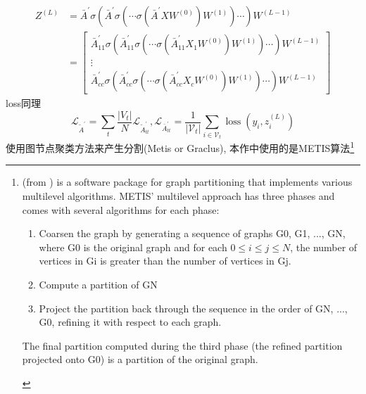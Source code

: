 \documentclass{article}
\begin{document}
    \begin{equation}
        \begin{aligned}
        Z^{(L)} &=\bar{A}^{\prime} \sigma\left(\bar{A}^{\prime} \sigma\left(\cdots \sigma\left(\bar{A}^{\prime} X W^{(0)}\right) W^{(1)}\right) \cdots\right) W^{(L-1)} \\
        &=\left[\begin{array}{l}
        \bar{A}_{11}^{\prime} \sigma\left(\bar{A}_{11}^{\prime} \sigma\left(\cdots \sigma\left(\bar{A}_{11}^{\prime} X_{1} W^{(0)}\right) W^{(1)}\right) \cdots\right) W^{(L-1)} \\
        \vdots \\
        \bar{A}_{c c}^{\prime} \sigma\left(\bar{A}_{c c}^{\prime} \sigma\left(\cdots \sigma\left(\bar{A}_{c c}^{\prime} X_{c} W^{(0)}\right) W^{(1)}\right) \cdots\right) W^{(L-1)}
        \end{array}\right]
        \end{aligned}
    \end{equation}
    loss同理
    \begin{equation}
        \mathcal{L}_{\tilde{A}^{\prime}}=\sum_{t} \frac{\left|V_{t}\right|}{N} \mathcal{L}_{\tilde{A}_{t t}^{\prime}}, \mathcal{L}_{\bar{A}_{t t}^{\prime}}=\frac{1}{\left|\mathcal{V}_{t}\right|} \sum_{i \in \mathcal{V}_{t}} \operatorname{loss}\left(y_{i}, z_{i}^{(L)}\right)
    \end{equation}
    使用图节点聚类方法来产生分割(Metis or Graclus), 本作中使用的是METIS算法\footnote{
        \begin{flushleft}
            (from \href{https://en.wikipedia.org/wiki/METIS}{}) is a software package for graph partitioning that implements various multilevel algorithms. METIS' multilevel approach has three phases and comes with several algorithms for each phase:
        
            \begin{enumerate}
                \item Coarsen the graph by generating a sequence of graphs G0, G1, ..., GN, where G0 is the original graph and for each $0 \le i \le j \le N$, the number of vertices in Gi is greater than the number of vertices in Gj.
                \item Compute a partition of GN
                \item Project the partition back through the sequence in the order of GN, ..., G0, refining it with respect to each graph.
            \end{enumerate}
            
            The final partition computed during the third phase (the refined partition projected onto G0) is a partition of the original graph.
        \end{flushleft}
    }
\end{document}

